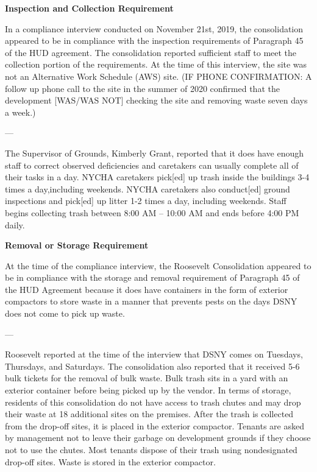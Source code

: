 

\textbf{Inspection and Collection Requirement}

In a compliance interview conducted on November 21st, 2019, the consolidation appeared to be in compliance with the inspection requirements of Paragraph 45 of the HUD agreement. The consolidation reported sufficient staff to meet the collection portion of the requirements. At the time of this interview, the site was not an Alternative Work Schedule (AWS) site. (IF PHONE CONFIRMATION: A follow up phone call to the site in the summer of 2020 confirmed that the development [WAS/WAS NOT] checking the site and removing waste seven days a week.)

---

The Supervisor of Grounds, Kimberly Grant, reported that it does have enough staff to correct observed deficiencies and caretakers can usually complete all of their tasks in a day. NYCHA caretakers pick[ed] up trash inside the buildings 3-4 times a day,including weekends. NYCHA caretakers also conduct[ed] ground inspections and pick[ed] up litter 1-2 times a day, including weekends. Staff begins collecting trash between 8:00 AM -- 10:00 AM and ends before 4:00 PM daily. 

\textbf{Removal or Storage Requirement}

At the time of the compliance interview, the Roosevelt Consolidation appeared to be in compliance with the storage and removal requirement of Paragraph 45 of the HUD Agreement because it does have containers in the form of exterior compactors to store waste in a manner that prevents pests on the days DSNY does not come to pick up waste.

---

Roosevelt reported at the time of the interview that DSNY comes on Tuesdays, Thursdays, and Saturdays. The consolidation also reported that it received 5-6 bulk tickets for the removal of bulk waste. Bulk trash sits in a yard with an exterior container before being picked up by the vendor. In terms of storage, residents of this consolidation do not have access to trash chutes and may drop their waste at 18 additional sites on the premises. After the trash is collected from the drop-off sites, it is placed in the exterior compactor. Tenants are asked by management not to leave their garbage on development grounds if they choose not to use the chutes. Most tenants dispose of their trash using nondesignated drop-off sites. Waste is stored in the exterior compactor.  

